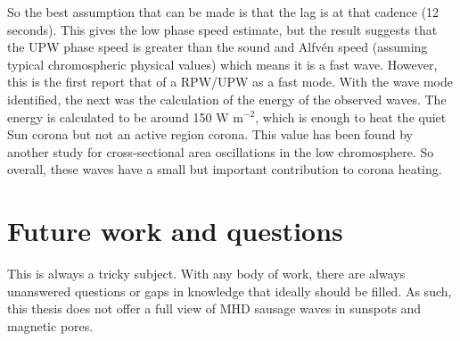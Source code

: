     So the best assumption that can be made is that the lag is at that cadence (12 seconds). 
    This gives the low phase speed estimate, but the result suggests that the UPW phase speed is greater than the sound and Alfv\'en speed (assuming typical chromospheric physical values) which means it is a fast wave. 
    However, this is the first report that of a RPW/UPW as a fast mode.
    With the wave mode identified, the next was the calculation of the energy of the observed waves.
    The energy is calculated to be around 150 W m$^{-2}$, which is enough to heat the quiet Sun corona but not an active region corona.
    This value has been found by another study for cross-sectional area oscillations in the low chromosphere.
    So overall, these waves have a small but important contribution to corona heating.
    
\section{Future work and questions}
    
    This is always a tricky subject.
    With any body of work, there are always unanswered questions or gaps in knowledge that ideally should be filled.
    As such, this thesis does not offer a full view of MHD sausage waves in sunspots and magnetic pores.
    
